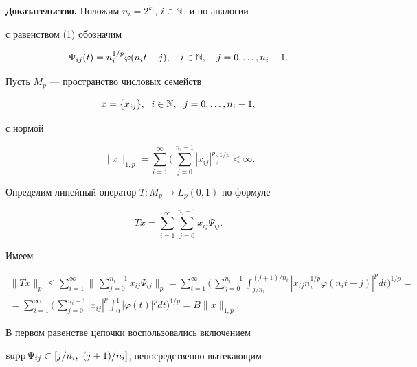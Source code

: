  


{\bf Доказательство.} Положим $n_i=2^{k_i}$, $i\in\Bbb N$, и по аналогии 


с равенством (1) обозначим 


\begin{equation}


\Psi_{ij}(t)=n^{1/p}_i\varphi(n_i t-j),\quad 


i\in\Bbb N,\quad j=0,\dotsc,n_i-1. 


\end{equation}


Пусть $M_p$ --- пространство числовых семейств 


$$ 


x=\{x_{ij}\},\ \; i\in\Bbb N,\ \; j=0,\dotsc,n_i-1, 


$$ 


с нормой 


$$ 


\|x\|_{1,p}=\sum^\infty_{i=1}\bigg(\, 


\sum^{n_i-1}_{j=0}|x_{ij}|^p\bigg)^{1/p}<\infty. 


$$ 


Определим линейный оператор $T:M_p\to L_p(0,1)$ по формуле 


$$ 


T x=\sum^\infty_{i=1}\sum^{n_i-1}_{j=0}x_{ij}\Psi_{ij}. 


$$ 


Имеем 


\begin{multline} 


\|T x\|_p\le\sum^\infty_{i=1}\bigg\|\, 


\sum^{n_i-1}_{j=0}x_{ij}\Psi_{ij}\bigg\|_p= 


\sum^\infty_{i=1}\bigg(\,\sum^{n_i-1}_{j=0} 


\int^{(j+1)/n_i}_{j/n_i}|x_{ij}n^{1/p}_i\varphi 


(n_i t-j)|^p dt\bigg)^{1/p} = \\ 


% 


=\sum^\infty_{i=1}\bigg(\,\sum^{n_i-1}_{j=0} 


|x_{ij}|^p\int^1_0|\varphi(t)|^p dt\bigg)^{1/p}= 


B\|x\|_{1,p}. 


\end{multline} 


В первом равенстве цепочки воспользовались включением 


$\supp\Psi_{ij}\subset[j/n_i,\ (j+1)/n_i]$, непосредственно вытекающим 


